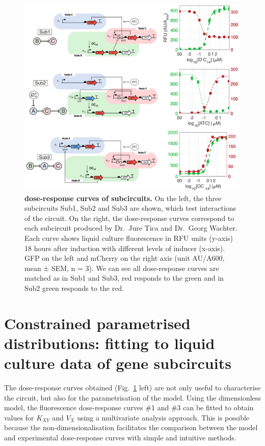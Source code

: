 \begin{figure}[H] %
    \centering
    \begin{adjustbox}{center}
        \includegraphics[width=1\textwidth]{chapters/Chapter 2/dose_response_experimental} %
    \end{adjustbox}
    \caption{\textbf{dose-response curves of subcircuits.}
    On the left, the three subcircuits Sub1, Sub2 and Sub3 are shown, which test interactions of the circuit. On the right, the dose-response curves correspond to each subcircuit produced by Dr.~Jure Tica and Dr.~Georg Wachter. Each curve shows liquid culture fluorescence in RFU units (y-axis) 18 hours after induction with different levels of inducer (x-axis).
    GFP on the left and mCherry on the right axis (unit AU/A600, mean ± SEM, n = 3). We can see all dose-response curves are matched as in Sub1 and Sub3, red responds to the green and in Sub2 green responds to the red.}
    \label{fig:dose_response_experimental} %
\end{figure}
\section{Constrained parametrised distributions:
fitting to liquid culture data of gene subcircuits}\label{Constrained parametrised distributions: fitting to liquid culture data of gene subcircuits}
The dose-response curves obtained (Fig.~\ref{fig:dose_response_experimental} left)
are not only useful to characterise the circuit,
but also for the parametrisation of the model.
Using the dimensionless model,
the fluorescence dose-response curves \#1 and \#3 can be fitted
to obtain values for $K_{XY}$ and $V_{X}$ using a multivariate analysis approach.
This is possible because the non-dimensionalisation facilitates the comparison between the model and experimental dose-response curves with simple and intuitive methods.


